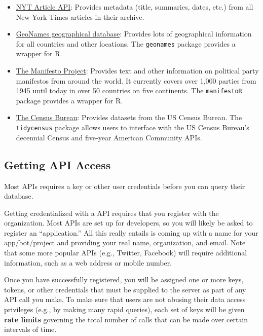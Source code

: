 \documentclass[]{book}
\providecommand{\tightlist}{%
  \setlength{\itemsep}{0pt}\setlength{\parskip}{0pt}}
\begin{document}
\begin{itemize}
\tightlist
\item
  \href{http://developer.nytimes.com/}{NYT Article API}: Provides
  metadata (title, summaries, dates, etc.) from all New York Times
  articles in their archive.
\item
  \href{https://www.geonames.org/}{GeoNames geographical database}:
  Provides lots of geographical information for all countries and other
  locations. The \texttt{geonames} package provides a wrapper for R.
\item
  \href{https://manifesto-project.wzb.eu/.}{The Manifesto Project}:
  Provides text and other information on political party manifestos from
  around the world. It currently covers over 1,000 parties from 1945
  until today in over 50 countries on five continents. The
  \texttt{manifestoR} package provides a wrapper for R.
\item
  \href{https://www.census.gov/developers/}{The Census Bureau}: Provides
  datasets from the US Census Bureau. The \texttt{tidycensus} package
  allows users to interface with the US Census Bureau's decennial Census
  and five-year American Community APIs.
\end{itemize}

\subsection{Getting API Access}\label{getting-api-access}

Most APIs requires a key or other user credentials before you can query
their database.

Getting credentialized with a API requires that you register with the
organization. Most APIs are set up for developers, so you will likely be
asked to register an ``application.'' All this really entails is coming
up with a name for your app/bot/project and providing your real name,
organization, and email. Note that some more popular APIs (e.g.,
Twitter, Facebook) will require additional information, such as a web
address or mobile number.

Once you have successfully registered, you will be assigned one or more
keys, tokens, or other credentials that must be supplied to the server
as part of any API call you make. To make sure that users are not
abusing their data access privileges (e.g., by making many rapid
queries), each set of keys will be given \textbf{rate limits} governing
the total number of calls that can be made over certain intervals of
time.
\end{document}
